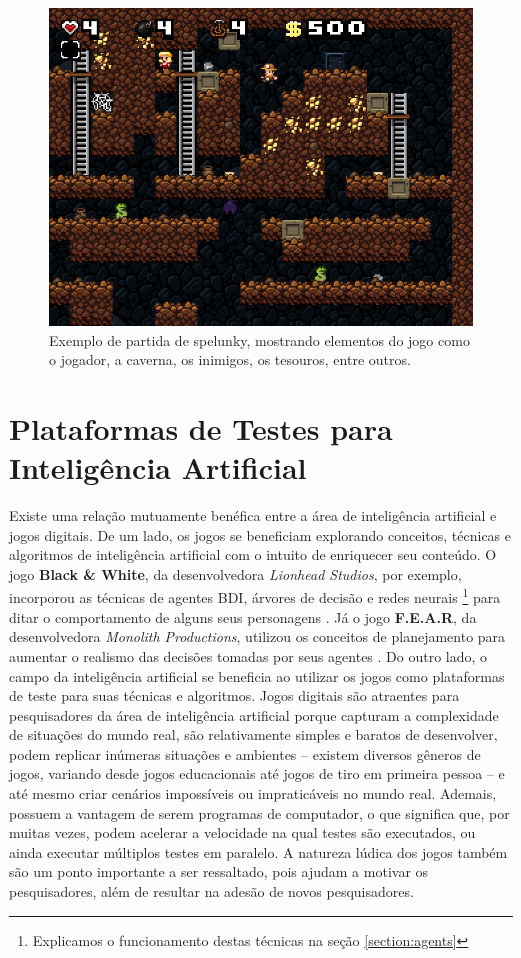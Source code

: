 \begin{figure}[htb!]
\centering\includegraphics[width=.65\textwidth]{fig/spelunky-pc-screen.png}
\caption {\label{fig:spelunky-gameplay}Exemplo de partida de spelunky, mostrando
elementos do jogo como o jogador, a caverna, os inimigos, os tesouros, entre
outros.} \end{figure}


\section{Plataformas de Testes para Inteligência Artificial}

Existe uma relação mutuamente benéfica entre a área de inteligência artificial e
jogos digitais.  De um lado, os jogos se beneficiam explorando conceitos,
técnicas e algoritmos de inteligência artificial com o intuito de enriquecer seu
conteúdo. O jogo \textbf{Black \& White}, da desenvolvedora \textit{Lionhead
Studios}, por exemplo, incorporou as técnicas de agentes BDI, árvores de decisão
e redes neurais \footnote{Explicamos o funcionamento destas técnicas na seção
\ref{section:agents}}  para ditar o comportamento de alguns seus personagens
\cite{TOPAIGAMES}.  Já o jogo \textbf{F.E.A.R}, da desenvolvedora
\textit{Monolith Productions}, utilizou os conceitos de planejamento para
aumentar o realismo das decisões tomadas por seus agentes \cite{FEARPLANNING}.
Do outro lado, o campo da inteligência artificial se beneficia ao utilizar os
jogos como plataformas de teste para suas técnicas e algoritmos. Jogos digitais
são atraentes para pesquisadores da área de inteligência artificial porque
capturam a complexidade de situações do mundo real, são relativamente simples e
baratos de desenvolver, podem replicar inúmeras situações e ambientes -- existem
diversos gêneros de jogos, variando desde jogos educacionais até jogos de tiro
em primeira pessoa -- e até mesmo criar cenários impossíveis ou impraticáveis no
mundo real. Ademais, possuem a vantagem de serem programas de computador, o que
significa que, por muitas vezes, podem acelerar a velocidade na qual testes são
executados, ou ainda executar múltiplos testes em paralelo. A natureza lúdica
dos jogos também são um ponto importante a ser ressaltado, pois ajudam a motivar
os pesquisadores, além de resultar na adesão de novos pesquisadores.

